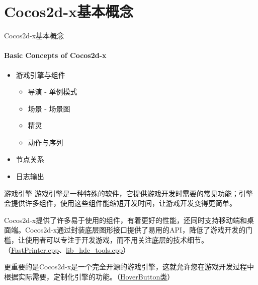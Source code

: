 \documentclass{beamer}
\newcommand{\hrefcol}[2]{\textcolor{cyan}{\href{#1}{#2}}}
\begin{document}

\section{Cocos2d-x基本概念}


\begin{chapter}{}{Cocos2d-x基本概念}
\framesubtitle{Basic Concepts of Cocos2d-x}
\begin{itemize}
\item 游戏引擎与组件
\begin{itemize}
\item 导演 - 单例模式
\item 场景 - 场景图
\item 精灵
\item 动作与序列
\end{itemize}
\item 节点关系
\item 日志输出
\end{itemize}
\end{chapter}


\begin{frame}[fragile]{游戏引擎}
游戏引擎是一种特殊的软件，它提供游戏开发时需要的常见功能；引擎会提供许多组件，使用这些组件能缩短开发时间，让游戏开发变得更简单。

\vspace{1em}

Cocos2d-x提供了许多易于使用的组件，有着更好的性能，还同时支持移动端和桌面端。Cocos2d-x通过封装底层图形接口提供了易用的API，降低了游戏开发的门槛，让使用者可以专注于开发游戏，而不用关注底层的技术细节。（\hrefcol{https://github.com/MinmusLin/Advanced_Language_Programming_and_OOP_Course_Projects/blob/main/common/FastPrinter.cpp}{FastPrinter.cpp}、\hrefcol{https://github.com/MinmusLin/Advanced_Language_Programming_and_OOP_Course_Projects/blob/main/common/lib_hdc_tools.cpp}{lib\_hdc\_tools.cpp}）

\vspace{1em}

更重要的是Cocos2d-x是一个完全开源的游戏引擎，这就允许您在游戏开发过程中根据实际需要，定制化引擎的功能。（\hrefcol{https://github.com/MinmusLin/Teamfight_Tactics/blob/main/src/Classes/Button}{HoverButton类}）
\end{frame}

\end{document}

